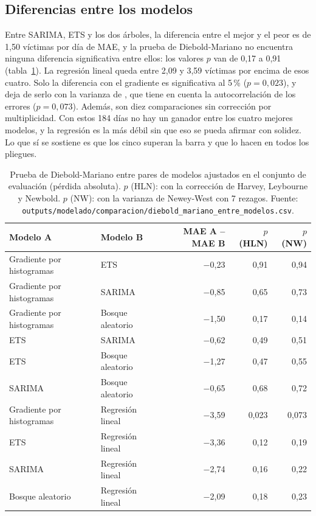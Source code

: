 \subsection{Diferencias entre los modelos}\label{sec:res-entre-modelos}

Entre SARIMA, ETS y los dos árboles, la diferencia entre el mejor y el peor es de 1,50 víctimas por día de MAE, y la prueba de Diebold-Mariano no encuentra ninguna diferencia significativa entre ellos: los valores $p$ van de 0,17 a 0,91 (tabla~\ref{tab:dm-pares}). La regresión lineal queda entre 2,09 y 3,59 víctimas por encima de esos cuatro. Solo la diferencia con el gradiente es significativa al 5\,\% ($p = 0{,}023$), y deja de serlo con la varianza de \citet{newey1987}, que tiene en cuenta la autocorrelación de los errores ($p = 0{,}073$). Además, son diez comparaciones sin corrección por multiplicidad. Con estos 184 días no hay un ganador entre los cuatro mejores modelos, y la regresión es la más débil sin que eso se pueda afirmar con solidez. Lo que sí se sostiene es que los cinco superan la barra y que lo hacen en todos los pliegues.

\begin{table}[H]
\centering
\caption{Prueba de Diebold-Mariano entre pares de modelos ajustados en el conjunto de evaluación (pérdida absoluta). $p$ (HLN): con la corrección de Harvey, Leybourne y Newbold. $p$ (NW): con la varianza de Newey-West con 7 rezagos. Fuente: \texttt{outputs/\allowbreak{}modelado/\allowbreak{}comparacion/\allowbreak{}diebold\_\allowbreak{}mariano\_\allowbreak{}entre\_\allowbreak{}modelos.csv}.}\label{tab:dm-pares}
\small
\begin{tabular}{@{}llrrr@{}}
\toprule
\textbf{Modelo A} & \textbf{Modelo B} & \textbf{MAE A -- MAE B} & \textbf{$p$ (HLN)} & \textbf{$p$ (NW)} \\
\midrule
Gradiente por histogramas & ETS & $-$0,23 & 0,91 & 0,94 \\
Gradiente por histogramas & SARIMA & $-$0,85 & 0,65 & 0,73 \\
Gradiente por histogramas & Bosque aleatorio & $-$1,50 & 0,17 & 0,14 \\
ETS & SARIMA & $-$0,62 & 0,49 & 0,51 \\
ETS & Bosque aleatorio & $-$1,27 & 0,47 & 0,55 \\
SARIMA & Bosque aleatorio & $-$0,65 & 0,68 & 0,72 \\
\midrule
Gradiente por histogramas & Regresión lineal & $-$3,59 & 0,023 & 0,073 \\
ETS & Regresión lineal & $-$3,36 & 0,12 & 0,19 \\
SARIMA & Regresión lineal & $-$2,74 & 0,16 & 0,22 \\
Bosque aleatorio & Regresión lineal & $-$2,09 & 0,18 & 0,23 \\
\bottomrule
\end{tabular}
\end{table}

